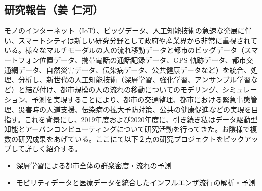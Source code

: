 \subsection{研究報告（姜 仁河）}
モノのインターネット（IoT）、ビッグデータ、人工知能技術の急速な発展に伴い、スマートシティは新しい研究分野として政府や産業界から非常に重視されている。様々なマルチモーダルの人の流れ移動データと都市のビッグデータ（スマートフォン位置データ、携帯電話の通話記録データ、GPS 軌跡データ、都市交通網データ、自然災害データ、伝染病データ、公共健康データなど）を統合、処理、分析し、新世代の人工知能技術（深層学習、強化学習、アンサンブル学習など）と結び付け、都市規模の人の流れの移動についてのモデリング、シミュレーション、予測を実現することにより、都市の交通整理、都市における緊急事態管理、災害時の人道支援、伝染病の拡大予防対策、公共の健康促進などの実現を目指す。これを背景にし、2019年度および2020年度に、引き続き私はデータ駆動型知能とアーバンコンピューティングについて研究活動を行ってきた。お陰様で複数の研究成果\cite{JIANG1901,JIANG2001,JIANG2002,JIANG2003,JIANG1902,JIANG1903,JIANG1904,JIANG2004,JIANG2005,JIANG2006}をあげている。ここにて以下２点の研究プロジェクトをピックアップして詳しく紹介する。

\begin{itemize}
    \item 深層学習による都市全体の群衆密度・流れの予測
    \item モビリティデータと医療データを統合したインフルエンザ流行の解析・予測
\end{itemize}

